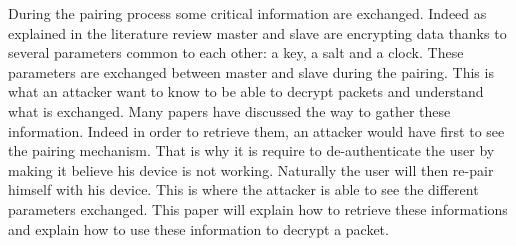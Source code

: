 During the pairing process some critical information are exchanged. Indeed as explained in the literature review master and slave are encrypting data thanks to several parameters common to each other: a key, a salt and a clock. These parameters are exchanged between master and slave during the pairing. This is what an attacker want to know to be able to decrypt packets and understand what is exchanged.
Many papers have discussed the way to gather these information. Indeed in order to retrieve them, an attacker would have first to see the pairing mechanism. That is why it is require to de-authenticate the user by making it believe his device is not working. Naturally the user will then re-pair himself with his device. This is where the attacker is able to see the different parameters exchanged. 
This paper will explain how to retrieve these informations and explain how to use these information to decrypt a packet.